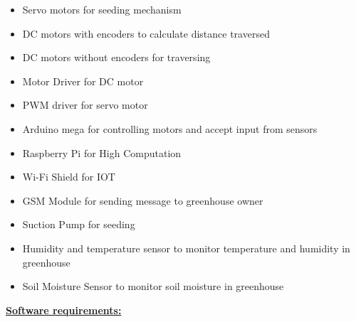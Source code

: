 \documentclass[12pt]{article}
\begin{document}
\begin{itemize}
	\item Servo motors for seeding mechanism\par

	\item DC motors with encoders to calculate distance traversed\par

	\item DC motors without encoders for traversing \par

	\item Motor Driver for DC motor\par

	\item PWM driver for servo motor\par

	\item Arduino mega for controlling motors and accept input from sensors\par

	\item Raspberry Pi for High Computation\par

	\item Wi-Fi Shield for IOT\par

	\item GSM Module for sending message to greenhouse owner\par

	\item Suction Pump for seeding\par

	\item Humidity and temperature sensor to monitor temperature and humidity in greenhouse\par

	\item Soil Moisture Sensor to monitor soil moisture in greenhouse
\end{itemize}\par

\begin{adjustwidth}{0.5in}{0.52in}
{\fontsize{14pt}{16.8pt}\selectfont \textbf{\uline{Software requirements:}}\par}\par

\end{adjustwidth}
\end{document}
